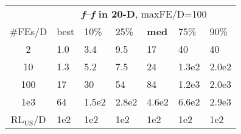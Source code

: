 \begin{tabular}{c|llllll}
 & \multicolumn{6}{|c}{\textbf{\textit{f}\raisebox{-0.35ex}{1}--\textit{f}\raisebox{-0.35ex}{24} in 20-D}, maxFE/D=100}\\
\#FEs/D & best & 10\% & 25\% & \textbf{med} & 75\% & 90\%\\
2 & \hspace*{1ex}1.0 & \hspace*{1ex}3.4 & \hspace*{1ex}9.5 & 17 & 40 & 40\\
10 & \hspace*{1ex}1.3 & \hspace*{1ex}5.2 & \hspace*{1ex}7.5 & 24 & 1.3e2 & 2.0e2\\
100 & 17 & 30 & 54 & 84 & 1.2e3 & 2.0e3\\
1e3 & 64 & 1.5e2 & 2.8e2 & 4.6e2 & 6.6e2 & 2.9e3\\
$\text{RL}_{\text{US}}$/D & 1e2 & 1e2 & 1e2 & 1e2 & 1e2 & 1e2
\end{tabular}
